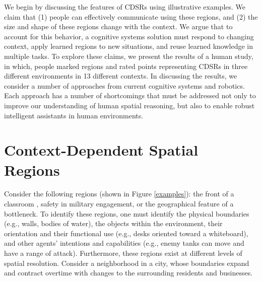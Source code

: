 \documentclass[11pt,letterpaper]{article}
\begin{document}
We begin by discussing the features of CDSRs using illustrative examples.  We claim that (1) people can effectively communicate using these regions, and (2) the size and shape of these regions change with the context.  We argue that to account for this behavior, a cognitive systems solution must respond to changing context, apply learned regions to new situations, and reuse learned knowledge in multiple tasks.  To explore these claims, we present the results of a human study, in which, people marked regions and rated points representing CDSRs in three different environments in 13 different contexts.  In discussing the results, we consider a number of approaches from current cognitive systems and robotics.  Each approach has a number of shortcomings that must be addressed not only to improve our understanding of human spatial reasoning, but also to enable robust intelligent assistants in human environments.

\section{Context-Dependent Spatial Regions}
Consider the following regions (shown in Figure \ref{examples}): the front of a classroom , safety in military engagement, or the geographical feature of a bottleneck.  To identify these regions, one must identify the physical boundaries (e.g., walls, bodies of water), the objects within the environment, their orientation and their functional use (e.g., desks oriented toward a whiteboard), and other agents' intentions and capabilities (e.g., enemy tanks can move and have a range of attack).  Furthermore, these regions exist at different levels of spatial resolution.  Consider a neighborhood in a city, whose boundaries expand and contract overtime with changes to the surrounding residents and businesses.
\end{document}
